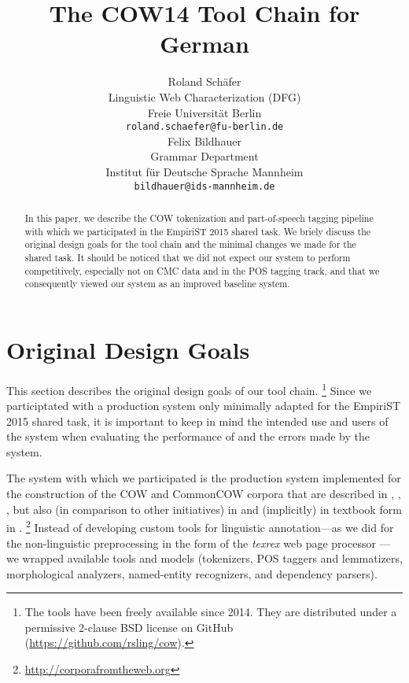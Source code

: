 \documentclass[11pt]{article}
\title{The COW14 Tool Chain for German}
\author{Roland Schäfer \\
  Linguistic Web Characterization (DFG) \\
  Freie Universität Berlin \\
  {\tt roland.schaefer@fu-berlin.de} \\\And
  Felix Bildhauer \\
  Grammar Department \\
  Institut für Deutsche Sprache Mannheim \\
  {\tt bildhauer@ids-mannheim.de} \\}
\date{}
\begin{document}
\maketitle

\begin{abstract}
  In this paper, we describe the COW tokenization and part-of-speech tagging pipeline with which we participated in the EmpiriST 2015 shared task.
  We briely discuss the original design goals for the tool chain and the minimal changes we made for the shared task.
  It should be noticed that we did not expect our system to perform competitively, especially not on CMC data and in the POS tagging track, and that we consequently viewed our system as an improved baseline system.
\end{abstract}

\section{Original Design Goals}
\label{sec:originaldesigngoals}

This section describes the original design goals of our tool chain.%
\footnote{The tools have been freely available since 2014.
  They are distributed under a permissive 2-clause BSD license on GitHub (\url{https://github.com/rsling/cow}).}
Since we participtated with a production system only minimally adapted for the EmpiriST 2015 shared task, it is important to keep in mind the intended use and users of the system when evaluating the performance of and the errors made by the system.

The system with which we participated is the production system implemented for the construction of the COW and CommonCOW corpora that are described in , , , but also (in comparison to other initiatives) in  and (implicitly) in textbook form in .%
\footnote{\url{http://corporafromtheweb.org}}
Instead of developing custom tools for linguistic annotation---as we did for the non-linguistic preprocessing in the form of the \textit{texrex} web page processor \cite{SchaeferBildhauer2012a,Schaefer2015b,Schaefer2016c}---we wrapped available tools and models (tokenizers, POS taggers and lemmatizers, morphological analyzers, named-entity recognizers, and dependency parsers).
\end{document}
